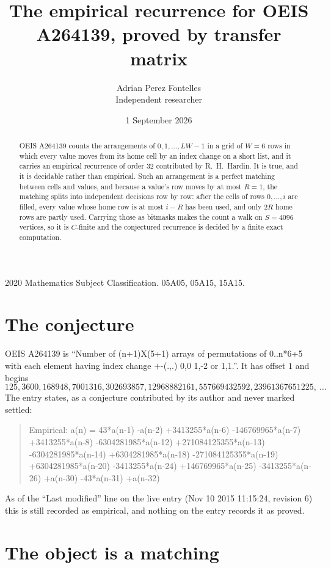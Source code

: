 \documentclass[11pt,a4paper]{article}
\title{The empirical recurrence for OEIS A264139, proved by transfer matrix}
\author{Adrian Perez Fontelles\\ \small Independent researcher}
\date{1 September 2026}
\theoremstyle{plain}
\theoremstyle{definition}
\begin{document}
\maketitle

\begin{abstract}
OEIS A264139 counts the arrangements of $0,1,\dots,LW-1$ in a grid of $W=6$ rows in which
every value moves from its home cell by an index change on a short list, and it carries an
empirical recurrence of order $32$ contributed by R.~H.~Hardin. It is true, and it is
decidable rather than empirical. Such an arrangement is a perfect matching between cells and
values, and because a value's row moves by at most $R=1$, the matching splits into
independent decisions row by row: after the cells of rows $0,\dots,i$ are filled,
every value whose home row is at most $i-R$ has been used, and only $2R$ home rows are
partly used. Carrying those as bitmasks makes the count a walk on $S=4096$ vertices, so it is
$C$-finite and the conjectured recurrence is decided by a finite exact computation.
\end{abstract}

\noindent\small 2020 Mathematics Subject Classification. 05A05, 05A15, 15A15.\normalsize

\section{The conjecture}

OEIS A264139 is ``Number of (n+1)X(5+1) arrays of permutations of 0..n*6+5 with each element having index change +-(.,.) 0,0 1,-2 or 1,1.''. It has offset $1$ and begins
\[
125, 3600, 168948, 7001316, 302693857, 12968882161, 557669432592, 23961367651225,\ \dots
\]
The entry states, as a conjecture contributed by its author and never marked settled:
\begin{quote}
Empirical: a(n) = 43*a(n-1) -a(n-2) +3413255*a(n-6) -146769965*a(n-7) +3413255*a(n-8) -6304281985*a(n-12) +271084125355*a(n-13) -6304281985*a(n-14) +6304281985*a(n-18) -271084125355*a(n-19) +6304281985*a(n-20) -3413255*a(n-24) +146769965*a(n-25) -3413255*a(n-26) +a(n-30) -43*a(n-31) +a(n-32)
\end{quote}
As of the ``Last modified'' line on the live entry (Nov 10 2015 11:15:24, revision 6) this is still
recorded as empirical, and nothing on the entry records it as proved.

\section{The object is a matching}
\end{document}
